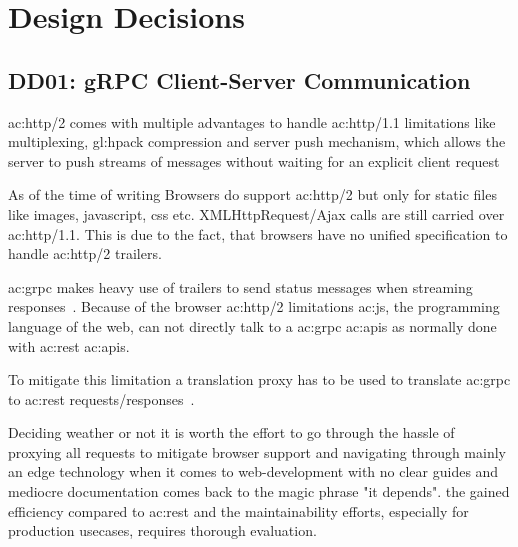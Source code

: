 
\pagebreak

\section{Design Decisions}

\subsection{DD01: gRPC Client-Server Communication}

\gls{ac:http}/2 comes with multiple advantages to handle \gls{ac:http}/1.1 limitations like multiplexing, \gls{gl:hpack} compression and server push mechanism, which allows the server to push streams of messages without waiting for an explicit client request~\citep{RFC7540}

As of the time of writing Browsers do support \gls{ac:http}/2 but only for static files like images, javascript, css etc. XMLHttpRequest/Ajax calls are still carried over \gls{ac:http}/1.1. This is due to the fact, that browsers have no unified specification to handle \gls{ac:http}/2 trailers.


\gls{ac:grpc} makes heavy use of trailers to send status messages when streaming responses~\citep{grpcspec}. Because of the browser \gls{ac:http}/2 limitations \gls{ac:js}, the programming language of the web, can not directly talk to a \gls{ac:grpc} \glspl{ac:api} as normally done with \gls{ac:rest} \glspl{ac:api}. 

To mitigate this limitation a translation proxy has to be used to translate \gls{ac:grpc} to \gls{ac:rest} requests/responses~\citep{grpcBrowserState}.



Deciding weather or not it is worth the effort to go through the hassle of proxying all requests to mitigate browser support and navigating through mainly an edge technology when it comes to web-development with no clear guides and mediocre documentation comes back to the magic phrase "it depends". the gained efficiency compared to \gls{ac:rest} and the maintainability efforts, especially for production usecases, requires thorough evaluation.

